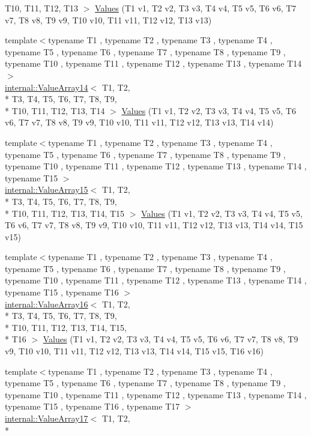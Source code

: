 \begin{DoxyCompactItemize}
T10, T11, T12, T13 $>$ \hyperlink{namespacetesting_aa13a09e043383c947042ba726d25d47c}{Values} (T1 v1, T2 v2, T3 v3, T4 v4, T5 v5, T6 v6, T7 v7, T8 v8, T9 v9, T10 v10, T11 v11, T12 v12, T13 v13)
\item 
{\footnotesize template$<$typename T1 , typename T2 , typename T3 , typename T4 , typename T5 , typename T6 , typename T7 , typename T8 , typename T9 , typename T10 , typename T11 , typename T12 , typename T13 , typename T14 $>$ }\\\hyperlink{classtesting_1_1internal_1_1ValueArray14}{internal\-::\-Value\-Array14}$<$ T1, T2, \\*
T3, T4, T5, T6, T7, T8, T9, \\*
T10, T11, T12, T13, T14 $>$ \hyperlink{namespacetesting_a2d00ed785e0e796e6f36dc79c051dc76}{Values} (T1 v1, T2 v2, T3 v3, T4 v4, T5 v5, T6 v6, T7 v7, T8 v8, T9 v9, T10 v10, T11 v11, T12 v12, T13 v13, T14 v14)
\item 
{\footnotesize template$<$typename T1 , typename T2 , typename T3 , typename T4 , typename T5 , typename T6 , typename T7 , typename T8 , typename T9 , typename T10 , typename T11 , typename T12 , typename T13 , typename T14 , typename T15 $>$ }\\\hyperlink{classtesting_1_1internal_1_1ValueArray15}{internal\-::\-Value\-Array15}$<$ T1, T2, \\*
T3, T4, T5, T6, T7, T8, T9, \\*
T10, T11, T12, T13, T14, T15 $>$ \hyperlink{namespacetesting_ab0c1943e4f680df0d92c695ed0ac36df}{Values} (T1 v1, T2 v2, T3 v3, T4 v4, T5 v5, T6 v6, T7 v7, T8 v8, T9 v9, T10 v10, T11 v11, T12 v12, T13 v13, T14 v14, T15 v15)
\item 
{\footnotesize template$<$typename T1 , typename T2 , typename T3 , typename T4 , typename T5 , typename T6 , typename T7 , typename T8 , typename T9 , typename T10 , typename T11 , typename T12 , typename T13 , typename T14 , typename T15 , typename T16 $>$ }\\\hyperlink{classtesting_1_1internal_1_1ValueArray16}{internal\-::\-Value\-Array16}$<$ T1, T2, \\*
T3, T4, T5, T6, T7, T8, T9, \\*
T10, T11, T12, T13, T14, T15, \\*
T16 $>$ \hyperlink{namespacetesting_afebcdc503d4a99cae5924523dcfd02e1}{Values} (T1 v1, T2 v2, T3 v3, T4 v4, T5 v5, T6 v6, T7 v7, T8 v8, T9 v9, T10 v10, T11 v11, T12 v12, T13 v13, T14 v14, T15 v15, T16 v16)
\item 
{\footnotesize template$<$typename T1 , typename T2 , typename T3 , typename T4 , typename T5 , typename T6 , typename T7 , typename T8 , typename T9 , typename T10 , typename T11 , typename T12 , typename T13 , typename T14 , typename T15 , typename T16 , typename T17 $>$ }\\\hyperlink{classtesting_1_1internal_1_1ValueArray17}{internal\-::\-Value\-Array17}$<$ T1, T2, \\*

\end{DoxyCompactItemize}
